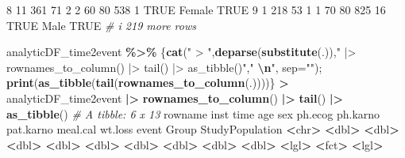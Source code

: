 \documentclass[
]{article}
\newenvironment{Shaded}{\begin{snugshade}}{\end{snugshade}}
\newcommand{\AttributeTok}[1]{\textcolor[rgb]{0.13,0.29,0.53}{#1}}
\newcommand{\CommentTok}[1]{\textcolor[rgb]{0.56,0.35,0.01}{\textit{#1}}}
\newcommand{\ConstantTok}[1]{\textcolor[rgb]{0.56,0.35,0.01}{#1}}
\newcommand{\DecValTok}[1]{\textcolor[rgb]{0.00,0.00,0.81}{#1}}
\newcommand{\ErrorTok}[1]{\textcolor[rgb]{0.64,0.00,0.00}{\textbf{#1}}}
\newcommand{\FunctionTok}[1]{\textcolor[rgb]{0.13,0.29,0.53}{\textbf{#1}}}
\newcommand{\NormalTok}[1]{#1}
\newcommand{\SpecialCharTok}[1]{\textcolor[rgb]{0.81,0.36,0.00}{\textbf{#1}}}
\newcommand{\StringTok}[1]{\textcolor[rgb]{0.31,0.60,0.02}{#1}}
\begin{document}
\begin{Shaded}
\begin{Highlighting}[]
\DecValTok{8}    \DecValTok{11}   \DecValTok{361}    \DecValTok{71}     \DecValTok{2}       \DecValTok{2}       \DecValTok{60}        \DecValTok{80}      \DecValTok{538}       \DecValTok{1} \ConstantTok{TRUE}\NormalTok{  Female }\ConstantTok{TRUE}           
\DecValTok{9}     \DecValTok{1}   \DecValTok{218}    \DecValTok{53}     \DecValTok{1}       \DecValTok{1}       \DecValTok{70}        \DecValTok{80}      \DecValTok{825}      \DecValTok{16} \ConstantTok{TRUE}\NormalTok{  Male   }\ConstantTok{TRUE}           
\CommentTok{\# i 219 more rows}
\end{Highlighting}
\end{Shaded}

\begin{Shaded}
\begin{Highlighting}[]
\NormalTok{analyticDF\_time2event }\SpecialCharTok{\%\textgreater{}\%}\NormalTok{ \{}\FunctionTok{cat}\NormalTok{(}\StringTok{" \textgreater{} "}\NormalTok{,}\FunctionTok{deparse}\NormalTok{(}\FunctionTok{substitute}\NormalTok{(.)),}\StringTok{" |\textgreater{} rownames\_to\_column() |\textgreater{} tail() |\textgreater{} as\_tibble()"}\NormalTok{,}\StringTok{"  }\SpecialCharTok{\textbackslash{}n}\StringTok{"}\NormalTok{, }\AttributeTok{sep=}\StringTok{""}\NormalTok{); }\FunctionTok{print}\NormalTok{(}\FunctionTok{as\_tibble}\NormalTok{(}\FunctionTok{tail}\NormalTok{(}\FunctionTok{rownames\_to\_column}\NormalTok{(.))))\}}
 \SpecialCharTok{\textgreater{}}\NormalTok{ analyticDF\_time2event }\SpecialCharTok{|\textgreater{}} \FunctionTok{rownames\_to\_column}\NormalTok{() }\SpecialCharTok{|\textgreater{}} \FunctionTok{tail}\NormalTok{() }\SpecialCharTok{|\textgreater{}} \FunctionTok{as\_tibble}\NormalTok{()  }
\CommentTok{\# A tibble: 6 x 13}
\NormalTok{  rowname  inst  time   age   sex ph.ecog ph.karno pat.karno meal.cal wt.loss event Group  StudyPopulation}
  \SpecialCharTok{\textless{}}\NormalTok{chr}\SpecialCharTok{\textgreater{}}   \ErrorTok{\textless{}}\NormalTok{dbl}\SpecialCharTok{\textgreater{}} \ErrorTok{\textless{}}\NormalTok{dbl}\SpecialCharTok{\textgreater{}} \ErrorTok{\textless{}}\NormalTok{dbl}\SpecialCharTok{\textgreater{}} \ErrorTok{\textless{}}\NormalTok{dbl}\SpecialCharTok{\textgreater{}}   \ErrorTok{\textless{}}\NormalTok{dbl}\SpecialCharTok{\textgreater{}}    \ErrorTok{\textless{}}\NormalTok{dbl}\SpecialCharTok{\textgreater{}}     \ErrorTok{\textless{}}\NormalTok{dbl}\SpecialCharTok{\textgreater{}}    \ErrorTok{\textless{}}\NormalTok{dbl}\SpecialCharTok{\textgreater{}}   \ErrorTok{\textless{}}\NormalTok{dbl}\SpecialCharTok{\textgreater{}} \ErrorTok{\textless{}}\NormalTok{lgl}\SpecialCharTok{\textgreater{}} \ErrorTok{\textless{}}\NormalTok{fct}\SpecialCharTok{\textgreater{}}  \ErrorTok{\textless{}}\NormalTok{lgl}\SpecialCharTok{\textgreater{}}          

\end{Highlighting}
\end{Shaded}
\end{document}
